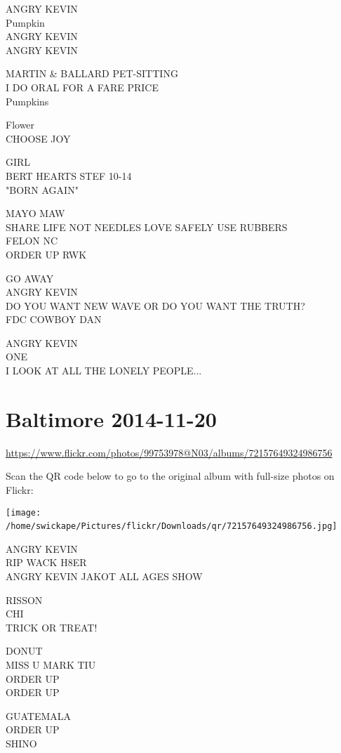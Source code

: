 \documentclass[10pt,letterpaper]{article}
\begin{document}
ANGRY KEVIN\\
Pumpkin\\
ANGRY KEVIN\\
ANGRY KEVIN

MARTIN \& BALLARD PET{-}SITTING\\
I DO ORAL FOR A FARE PRICE\\
Pumpkins

Flower\\
CHOOSE JOY

GIRL\\
BERT HEARTS STEF 10{-}14\\
"BORN AGAIN"

MAYO MAW\\
SHARE LIFE NOT NEEDLES LOVE SAFELY USE RUBBERS\\
FELON NC\\
ORDER UP RWK

GO AWAY\\
ANGRY KEVIN\\
DO YOU WANT NEW WAVE OR DO YOU WANT THE TRUTH?\\
FDC COWBOY DAN

ANGRY KEVIN\\
ONE\\
I LOOK AT ALL THE LONELY PEOPLE...
\

\section*{Baltimore 2014-11-20}

\url{https://www.flickr.com/photos/99753978@N03/albums/72157649324986756}

Scan the QR code below to go to the original album with full-size photos on Flickr:

\texttt{[image: /home/swickape/Pictures/flickr/Downloads/qr/72157649324986756.jpg]}
\

ANGRY KEVIN\\
RIP WACK H8ER\\
ANGRY KEVIN JAKOT ALL AGES SHOW

RISSON\\
CHI\\
TRICK OR TREAT!

DONUT\\
MISS U MARK TIU\\
ORDER UP\\
ORDER UP

GUATEMALA\\
ORDER UP\\
SHINO
\end{document}

